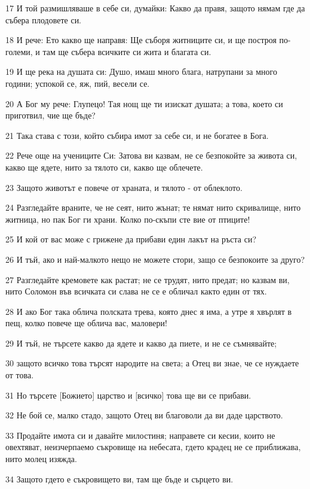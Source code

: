 \par 17 И той размишляваше в себе си, думайки: Какво да правя, защото нямам где да събера плодовете си.
\par 18 И рече: Ето какво ще направя: Ще съборя житниците си, и ще построя по-големи, и там ще събера всичките си жита и благата си.
\par 19 И ще река на душата си: Душо, имаш много блага, натрупани за много години; успокой се, яж, пий, весели се.
\par 20 А Бог му рече: Глупецо! Тая нощ ще ти изискат душата; а това, което си приготвил, чие ще бъде?
\par 21 Така става с този, който събира имот за себе си, и не богатее в Бога.
\par 22 Рече още на учениците Си: Затова ви казвам, не се безпокойте за живота си, какво ще ядете, нито за тялото си, какво ще облечете.
\par 23 Защото животът е повече от храната, и тялото - от облеклото.
\par 24 Разгледайте враните, че не сеят, нито жънат; те нямат нито скривалище, нито житница, но пак Бог ги храни. Колко по-скъпи сте вие от птиците!
\par 25 И кой от вас може с грижене да прибави един лакът на ръста си?
\par 26 И тъй, ако и най-малкото нещо не можете стори, защо се безпокоите за друго?
\par 27 Разгледайте кремовете как растат; не се трудят, нито предат; но казвам ви, нито Соломон във всичката си слава не се е обличал както един от тях.
\par 28 И ако Бог така облича полската трева, която днес я има, а утре я хвърлят в пещ, колко повече ще облича вас, маловери!
\par 29 И тъй, не търсете какво да ядете и какво да пиете, и не се съмнявайте;
\par 30 защото всичко това търсят народите на света; а Отец ви знае, че се нуждаете от това.
\par 31 Но търсете [Божието] царство и [всичко] това ще ви се прибави.
\par 32 Не бой се, малко стадо, защото Отец ви благоволи да ви даде царството.
\par 33 Продайте имота си и давайте милостиня; направете си кесии, които не овехтяват, неизчерпаемо съкровище на небесата, гдето крадец не се приближава, нито молец изяжда.
\par 34 Защото гдето е съкровището ви, там ще бъде и сърцето ви.
